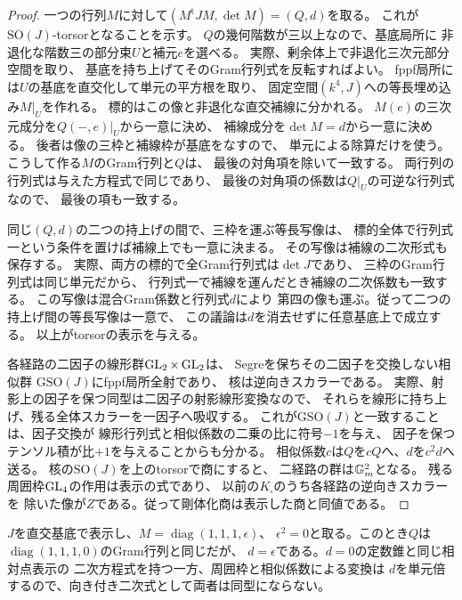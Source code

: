 \begin{proof}
一つの行列$M$に対して$(M^{\mathrm{t}}JM,\det M)=(Q,d)$を取る。
これが$\mathrm{SO}(J)$-torsorとなることを示す。
$Q$の幾何階数が三以上なので、基底局所に
非退化な階数三の部分束$U$と補元$e$を選べる。
実際、剰余体上で非退化三次元部分空間を取り、
基底を持ち上げてそのGram行列式を反転すればよい。
fppf局所には$U$の基底を直交化して単元の平方根を取り、
固定空間$(k^4,J)$への等長埋め込み$M|_U$を作れる。
標的はこの像と非退化な直交補線に分かれる。
$M(e)$の三次元成分を$Q(-,e)|_U$から一意に決め、
補線成分を$\det M=d$から一意に決める。
後者は像の三枠と補線枠が基底をなすので、
単元による除算だけを使う。
こうして作る$M$のGram行列と$Q$は、
最後の対角項を除いて一致する。
両行列の行列式は与えた方程式で同じであり、
最後の対角項の係数は$Q|_U$の可逆な行列式なので、
最後の項も一致する。

同じ$(Q,d)$の二つの持上げの間で、三枠を運ぶ等長写像は、
標的全体で行列式一という条件を置けば補線上でも一意に決まる。
その写像は補線の二次形式も保存する。
実際、両方の標的で全Gram行列式は$\det J$であり、
三枠のGram行列式は同じ単元だから、
行列式一で補線を運んだとき補線の二次係数も一致する。
この写像は混合Gram係数と行列式$d$により
第四の像も運ぶ。従って二つの持上げ間の等長写像は一意で、
この議論は$d$を消去せずに任意基底上で成立する。
以上がtorsorの表示を与える。

各経路の二因子の線形群$\operatorname{GL}_2\times\operatorname{GL}_2$は、
Segreを保ちその二因子を交換しない相似群
$\mathrm{GSO}(J)$にfppf局所全射であり、
核は逆向きスカラーである。
実際、射影上の因子を保つ同型は二因子の射影線形変換なので、
それらを線形に持ち上げ、残る全体スカラーを一因子へ吸収する。
これが$\mathrm{GSO}(J)$と一致することは、因子交換が
線形行列式と相似係数の二乗の比に符号$-1$を与え、
因子を保つテンソル積が比$+1$を与えることからも分かる。
相似係数$c$は$Q$を$cQ$へ、$d$を$c^2d$へ送る。
核の$\mathrm{SO}(J)$を上のtorsorで商にすると、
二経路の群は$\mathbb G_m^2$となる。
残る周囲枠$\operatorname{GL}_4$の作用は表示の式であり、
以前の$K_\square$のうち各経路の逆向きスカラーを
除いた像が$Z$である。従って剛体化商は表示した商と同値である。
\end{proof}

\begin{example}[二次式が同じでも向きが異なる一次変形]
$J$を直交基底で表示し、$M=\operatorname{diag}(1,1,1,\epsilon)$、
$\epsilon^2=0$と取る。このとき$Q$は
$\operatorname{diag}(1,1,1,0)$のGram行列と同じだが、
$d=\epsilon$である。$d=0$の定数錐と同じ相対点表示の
二次方程式を持つ一方、周囲枠と相似係数による変換は
$d$を単元倍するので、向き付き二次式として両者は同型にならない。
\end{example}
